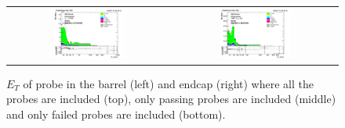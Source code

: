 \begin{figure}[bh]
\begin{center}
\begin{tabular}{cc}
      \includegraphics[width=0.45\textwidth]{figures/Zprime/2016/ScaleFactor/SameSign/DY_amcatnlo_check/stack_Et_Barrel_fail_PUW.png} &
      \includegraphics[width=0.45\textwidth]{figures/Zprime/2016/ScaleFactor/SameSign/DY_amcatnlo_check/stack_Et_Endcap_fail_PUW.png}
    \end{tabular}
    \caption{$E_T$ of probe in the barrel (left) and endcap (right) where all the probes are included (top), only passing probes are included (middle) and only failed probes are included (bottom).}
    \label{fig:SS_amcatnlo_nominal_ET_2016}
  \end{center}
\end{figure}

